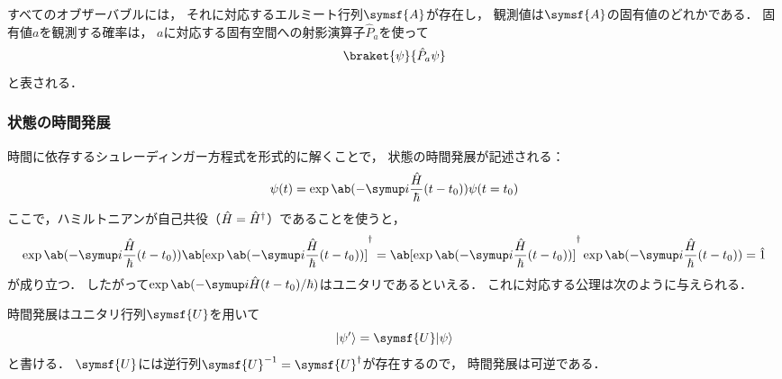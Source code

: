 \documentclass[
]{sotsu}
\begin{document}
\begin{qmaxiom}
    すべてのオブザーバブルには，
    それに対応するエルミート行列$\symsf{A}$が存在し，
    観測値は$\symsf{A}$の固有値のどれかである．
    固有値$a$を観測する確率は，
    $a$に対応する固有空間への射影演算子$\hat{P}_a$を使って
    \begin{equation}
        \braket{\psi}{\hat{P}_a \psi}
    \end{equation}
    と表される．
\end{qmaxiom}


\subsubsection{状態の時間発展}

時間に依存するシュレーディンガー方程式を形式的に解くことで，
状態の時間発展が記述される：
\begin{equation*}
    \psi(t) = \exp \ab(-\iu \frac{\hat{H}}{\hbar} (t - t_0)) \psi(t = t_0)
\end{equation*}
ここで，ハミルトニアンが自己共役（$\hat{H} = {\hat{H}}^\dagger$）であることを使うと，
\begin{equation*}
      \exp \ab(-\iu \frac{\hat{H}}{\hbar} (t - t_0))
      \adjoint{\ab[ \exp \ab(-\iu \frac{\hat{H}}{\hbar} (t - t_0)) ]}
    = \adjoint{\ab[ \exp \ab(-\iu \frac{\hat{H}}{\hbar} (t - t_0)) ]}
      \exp \ab(-\iu \frac{\hat{H}}{\hbar} (t - t_0))
    = \idop
\end{equation*}
が成り立つ．
したがって$\exp \ab( -\iu \hat{H} (t - t_0) / \hbar )$はユニタリであるといえる．
これに対応する公理は次のように与えられる．

\begin{qmaxiom}
    時間発展はユニタリ行列$\symsf{U}$を用いて
    \begin{equation}
        \ket{\psi'} = \symsf{U} \ket{\psi}
    \end{equation}
    と書ける．
    $\symsf{U}$には逆行列$\symsf{U}^{-1} = \adjoint{\symsf{U}}$が存在するので，
    時間発展は可逆である．
\end{qmaxiom}
\end{document}
